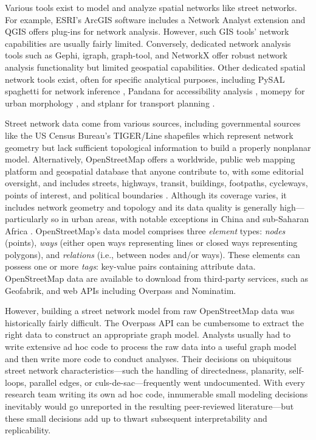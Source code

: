 \documentclass[12pt,letterpaper]{article} %
\begin{document}
Various tools exist to model and analyze spatial networks like street networks. For example, ESRI's ArcGIS software includes a Network Analyst extension and QGIS offers plug-ins for network analysis. However, such GIS tools' network capabilities are usually fairly limited. Conversely, dedicated network analysis tools such as Gephi, igraph, graph-tool, and NetworkX offer robust network analysis functionality but limited geospatial capabilities. Other dedicated spatial network tools exist, often for specific analytical purposes, including PySAL spaghetti for network inference \citep{gaboardi_spaghetti_2021,rey_pysal_2022}, Pandana for accessibility analysis \citep{foti_behavioral_2014}, momepy for urban morphology \citep{fleischmann_momepy_2019}, and stplanr for transport planning \citep{lovelace_stplanr_2019}.

Street network data come from various sources, including governmental sources like the US Census Bureau's TIGER/Line shapefiles which represent network geometry but lack sufficient topological information to build a properly nonplanar model. Alternatively, OpenStreetMap offers a worldwide, public web mapping platform and geospatial database that anyone contribute to, with some editorial oversight, and includes streets, highways, transit, buildings, footpaths, cycleways, points of interest, and political boundaries \citep{jokar_arsanjani_openstreetmap_2015}. Although its coverage varies, it includes network geometry and topology and its data quality is generally high---particularly so in urban areas, with notable exceptions in China and sub-Saharan Africa \citep{barron_comprehensive_2014,barrington-leigh_worlds_2017}. OpenStreetMap's data model comprises three \textit{element} types: \textit{nodes} (points), \textit{ways} (either open ways representing lines or closed ways representing polygons), and \textit{relations} (i.e., between nodes and/or ways). These elements can possess one or more \textit{tags}: key-value pairs containing attribute data. OpenStreetMap data are available to download from third-party services, such as Geofabrik, and web APIs including Overpass and Nominatim.

However, building a street network model from raw OpenStreetMap data was historically fairly difficult. The Overpass API can be cumbersome to extract the right data to construct an appropriate graph model. Analysts usually had to write extensive ad hoc code to process the raw data into a useful graph model and then write more code to conduct analyses. Their decisions on ubiquitous street network characteristics---such the handling of directedness, planarity, self-loops, parallel edges, or culs-de-sac---frequently went undocumented. With every research team writing its own ad hoc code, innumerable small modeling decisions inevitably would go unreported in the resulting peer-reviewed literature---but these small decisions add up to thwart subsequent interpretability and replicability.
\end{document}
